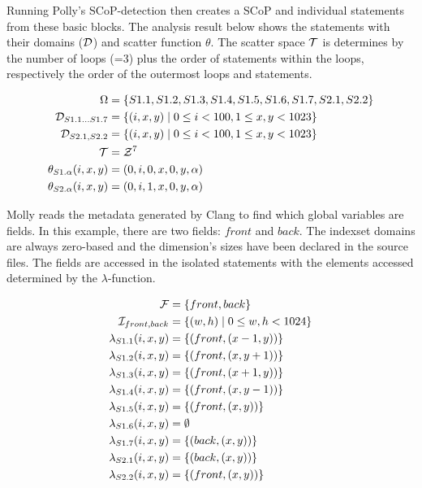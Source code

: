 \documentclass{sigplanconf}
\newcommand{\Stmt}{\Omega} \newcommand{\Field}{{\cal F}}
\newcommand{\Dom}{{\cal D}}
\newcommand{\Idx}{{\cal I}}
\newcommand{\Scat}{{\cal T}}
\begin{document}
Running Polly's SCoP-detection then creates a SCoP and individual statements from these basic blocks. The analysis result below shows the statements with their domains ($\Dom$) and scatter function $\theta$. The scatter space $\Scat$ is determines by the number of loops (=3) plus the order of statements within the loops, respectively the order of the outermost loops and statements.

\begin{align*}
  \Stmt &= \{ S1.1, S1.2, S1.3, S1.4, S1.5, S1.6, S1.7, S2.1, S2.2 \}\\
  \Dom_{S1.1 \dots S1.7} &= \{ (i, x, y) \mid 0 \le i < 100, 1 \le x,y < 1023 \}\\
  \Dom_{S2.1, S2.2} &= \{ (i, x, y) \mid 0 \le i < 100, 1 \le x,y < 1023 \}\\
  \Scat &= {\cal Z}^7\\
  \theta_{S1.\alpha}(i,x,y) &= (0, i, 0, x, 0, y, \alpha)\\
  \theta_{S2.\alpha}(i,x,y) &= (0, i, 1, x, 0, y, \alpha)
\end{align*}


Molly reads the metadata generated by Clang to find which global variables are fields. In this example, there are two fields: $front$ and $back$. The indexset domains are always zero-based and the dimension's sizes have been declared in the source files. The fields are accessed in the isolated statements with the elements accessed determined by the $\lambda$-function.

\begin{align*}
  \Field &= \{ front, back \}\\
  \Idx_{front,back} &= \{ (w,h) \mid 0 \le w,h < 1024 \}\\
  \lambda_{S1.1}(i,x,y) &= \{ (front, (x-1,y)) \}\\
  \lambda_{S1.2}(i,x,y) &= \{ (front, (x,y+1)) \}\\
  \lambda_{S1.3}(i,x,y) &= \{ (front, (x+1,y)) \}\\
  \lambda_{S1.4}(i,x,y) &= \{ (front, (x,y-1)) \}\\
  \lambda_{S1.5}(i,x,y) &= \{ (front, (x,y))   \}\\
  \lambda_{S1.6}(i,x,y) & = \emptyset \\
  \lambda_{S1.7}(i,x,y) &= \{ (back, (x,y))   \}\\
  \lambda_{S2.1}(i,x,y) &= \{ (back, (x,y))   \}\\
  \lambda_{S2.2}(i,x,y) &= \{ (front, (x,y))   \}
\end{align*}
\end{document}
